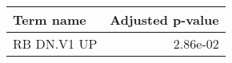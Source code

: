 \begin{tabular}{lr}
\toprule
  Term name &  Adjusted p-value \\
\midrule
RB DN.V1 UP &          2.86e-02 \\
\bottomrule
\end{tabular}
